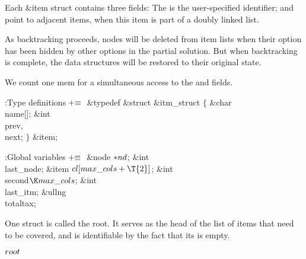 Each \&{item} struct contains three fields:
The  is the user-specified identifier;
 and  point to adjacent items, when this
item is part of a doubly linked list.

As backtracking proceeds, nodes
will be deleted from item lists when their option has been hidden by
other options in the partial solution.
But when backtracking is complete, the data structures will be
restored to their original state.

We count one mem for a simultaneous access to the  and  fields.

\Y\B\4:Type definitions\X${}\mathrel+\equiv{}$\6
\&{typedef} \&{struct} \&{itm\_struct} ${}\{{}$\1\6
\&{char} \\{name}[];\6
\&{int} \\{prev}${},{}$ \\{next};\2\6
${}\}{}$ \&{item};\par
\fi

\B{}:Global variables\X${}\mathrel+\equiv{}$\6
\&{node} ${}{*}\\{nd}{}$;\6
\&{int} \\{last\_node};\6
\&{item} ${}\\{cl}[\\{max\_cols}+\T{2}]{}$;\6
\&{int} \\{second}${}\K\\{max\_cols}{}$;\6
\&{int} \\{last\_itm};\6
\&{ullng} \\{totaltax};\par
\fi

One  struct is called the root. It serves as the head of the
list of items that need to be covered, and is identifiable by the fact
that its  is empty.

\Y\B\4\D$\\{root}$ \5
\par
\fi

